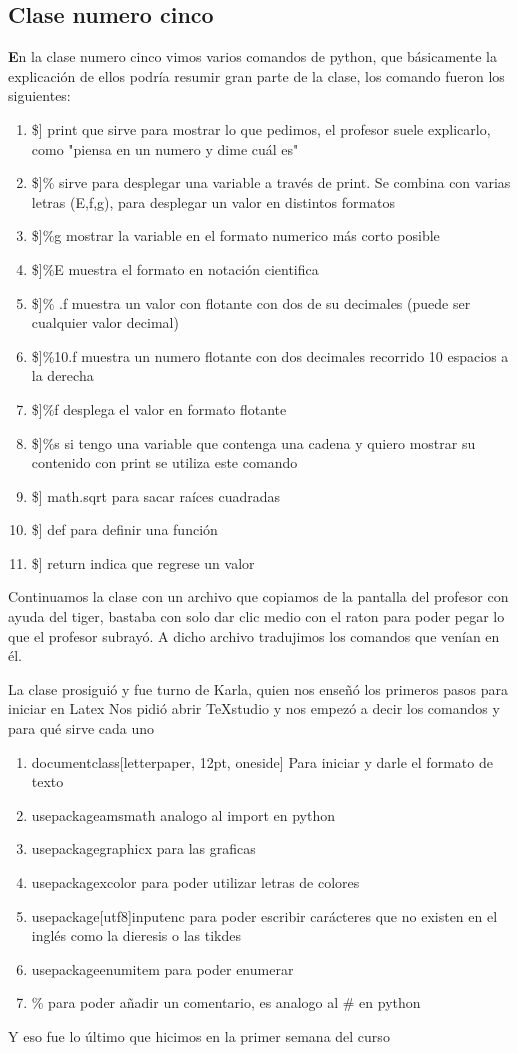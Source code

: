 \documentclass{book}
\begin{document}
\begin{enumerate}
\begin{enumerate}
\chapter{Clase numero cinco}
\textbf En la clase numero cinco vimos varios comandos de python, que básicamente la explicación de ellos podría resumir gran parte de la clase, los comando fueron los siguientes:
\begin{enumerate}
	\item \$] print que sirve para mostrar lo que pedimos, el profesor suele explicarlo, como "piensa en un numero y dime cuál es"
	\item \$]\% sirve para desplegar una variable a través de print. Se combina con varias letras (E,f,g), para desplegar un valor en distintos formatos
	\item \$]\%g mostrar la variable en el formato numerico más corto posible
	\item \$]\%E muestra el formato en notación cientifica
	\item \$]\% .f muestra un valor con flotante con dos de su decimales (puede ser cualquier valor decimal)
	\item \$]\%10.f muestra un numero flotante con dos decimales recorrido 10 espacios a la derecha
	\item \$]\%f desplega el valor en formato flotante
	\item \$]\%s si tengo una variable que contenga una cadena y quiero mostrar su contenido con print se utiliza este comando
	\item \$] math.sqrt para sacar raíces cuadradas
	\item \$] def para definir una función
	\item \$] return indica que regrese un valor
\end{enumerate}
Continuamos la clase con un archivo que copiamos de la pantalla del profesor con ayuda del tiger, bastaba con solo dar clic medio con el raton para poder pegar lo que el profesor subrayó. A dicho archivo tradujimos los comandos que venían en él.


La clase prosiguió y fue turno de Karla, quien nos enseñó los primeros pasos para iniciar en Latex
Nos pidió abrir TeXstudio
y nos empezó a decir los comandos y para qué sirve cada uno
\begin{enumerate}
	\item documentclass[letterpaper, 12pt, oneside] Para iniciar y darle el formato de texto
	\item usepackage{amsmath} analogo al import en python
	\item usepackage{graphicx} para las graficas 
	\item usepackage{xcolor} para poder utilizar letras de colores
	\item usepackage[utf8]{inputenc} para poder escribir carácteres que no existen en el inglés como la dieresis o las tikdes
	\item usepackage{enumitem} para poder enumerar 
	\item \% para poder añadir un comentario, es analogo al \# en python
\end{enumerate}
Y eso fue lo último que hicimos en la primer semana del curso


\end{enumerate}
\end{enumerate}
\end{document}
